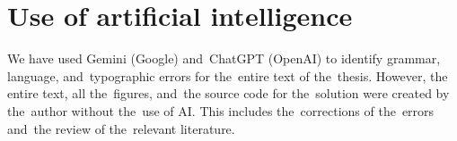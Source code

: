 \chapter{Use of artificial intelligence}

We have used Gemini (Google) and~ChatGPT (OpenAI) to identify grammar, language, and~typographic errors for the~entire text of the~thesis. However, the entire text, all the~figures, and~the source code for the~solution were created by the~author without the~use of AI. This includes the~corrections of the~errors and~the review of the~relevant literature.
